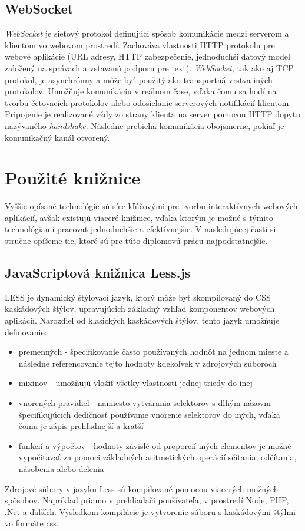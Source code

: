 \subsection{WebSocket}
\textit{WebSocket} je sieťový protokol definujúci spôsob komunikácie medzi serverom a klientom vo webovom prostredí. Zachováva vlastnosti HTTP protokolu pre webové aplikácie (URL adresy, HTTP zabezpečenie, jednoduchší dátový model založený na správach a vstavanú podporu pre text). \textit{WebSocket}, tak ako aj TCP protokol, je asynchrónny a môže byť použitý ako transportná vrstva iných protokolov. Umožňuje komunikáciu v reálnom čase, vďaka čomu sa hodí na tvorbu četovacích protokolov alebo odosielanie serverových notifikácií klientom. Pripojenie je realizované vždy zo strany klienta na server pomocou HTTP dopytu nazývaného \textit{handshake}\cite{Wang2013}. Následne prebieha komunikácia obojsmerne, pokiaľ je komunikačný kanál otvorený.

\section{Použité knižnice}
Vyššie opísané technológie sú síce kľúčovými pre tvorbu interaktívnych webových aplikácií, avšak existujú viaceré knižnice, vďaka ktorým je možné s týmito technológiami pracovať jednoduchšie a efektívnejšie. V nasledujúcej časti si stručne opíšeme tie, ktoré sú pre túto diplomovú prácu najpodstatnejšie.

\subsection{JavaScriptová knižnica Less.js}
LESS je dynamický štýlovací jazyk, ktorý môže byť skompilovaný do CSS kaskádových štýlov, upravujúcich základný vzhľad komponentov webových aplikácií. Narozdiel od klasických kaskádových štýlov, tento jazyk umožňuje definovanie: 
\begin{itemize}
	\item premenných - špecifikovanie často používaných hodnôt na jednom mieste a následné referencovanie tejto hodnoty kdekoľvek v zdrojových súboroch
	\item mixinov - umožňujú vložiť všetky vlastnosti jednej triedy do inej
	\item vnorených pravidiel - namiesto vytvárania selektorov s dlhým názovm špecifikujúcich dedičnosť používame vnorenie selektorov do iných, vďaka čomu je zápis prehľadnejší a kratší
	\item funkcií a výpočtov - hodnoty závislé od proporcií iných elementov je možné vypočítavať za pomoci základných aritmetických operácií sčítania, odčítania, násobenia alebo delenia
\end{itemize}
Zdrojové súbory v jazyku Less sú kompilované pomocou viacerých možných spôsobov. Napríklad priamo v prehliadači používateľa, v prostredí Node, PHP, .Net a ďalších. Výsledkom kompilácie je vytvorenie súboru s kaskádovými štýlmi vo formáte css.

